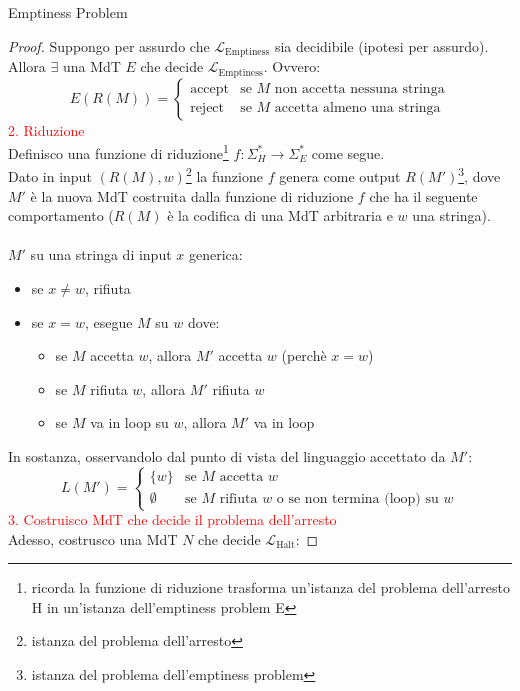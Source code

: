 \documentclass{article}  %
\theoremstyle{definition}
\begin{document}
\begin{theorem}{Emptiness Problem}
\begin{proof}
    Suppongo per assurdo che $\mathcal{L}_{\text{Emptiness}}$ sia decidibile (ipotesi per assurdo). Allora $\exists$ una MdT $E$ che decide $\mathcal{L}_{\text{Emptiness}}$.
    Ovvero:
    \[
    E(R(M)) =
    \begin{cases}
      \text{accept} & \text{se } M \text{ non accetta nessuna stringa} \\
      \text{reject} & \text{se } M \text{  accetta almeno una stringa}
    \end{cases}
    \]
    \textcolor{red}{2. Riduzione} \\
    Definisco una funzione di riduzione\footnote{ricorda la funzione di riduzione trasforma un'istanza del problema dell'arresto H in un'istanza dell'emptiness problem E}
     $f: \Sigma_H^* \rightarrow \Sigma_E^*$ come segue. \\
    Dato in input $(R(M),w)$\footnote{istanza del problema dell'arresto}  la funzione $f$ genera come output $R(M')$\footnote{istanza del problema dell'emptiness problem}, 
    dove $M'$ è la nuova MdT costruita dalla funzione di riduzione $f$ che ha il seguente comportamento ($R(M)$ è la codifica di una MdT arbitraria
    e $w$ una stringa). \\ \\ $M'$ su una stringa di input $x$ generica:
    \begin{itemize}
      \item se $x \neq w$, rifiuta
      \item se $x = w$, esegue $M$ su $w$ dove:
      \begin{itemize}
        \item se $M$ accetta $w$, allora $M'$ accetta $w$ (perchè $x=w$)
        \item se $M$ rifiuta $w$, allora $M'$ rifiuta $w$
        \item se $M$ va in loop su $w$, allora $M'$ va in loop
      \end{itemize}
    \end{itemize}
    In sostanza, osservandolo dal punto di vista del linguaggio accettato da $M'$:
    \[
    L(M') =
    \begin{cases}
      \{w\} & \text{se } M \text{ accetta } w\\
      \emptyset & \text{se } M \text{ rifiuta } w \text{ o se non termina (loop) su } w
    \end{cases}
    \]
    \textcolor{red}{3. Costruisco MdT che decide il problema dell'arresto} \\
    Adesso, costrusco una MdT $N$ che decide $\mathcal{L}_{\text{Halt}}$:

\end{proof}
\end{theorem}
\end{document}
